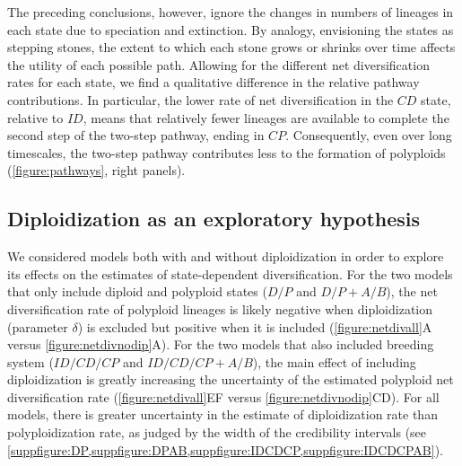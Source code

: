 
The preceding conclusions, however, ignore the changes in numbers of lineages in each state due to speciation and extinction.
By analogy, envisioning the states as stepping stones, the extent to which each stone grows or shrinks over time affects the utility of each possible path.
Allowing for the different net diversification rates for each state, we find a qualitative difference in the relative pathway contributions.
In particular, the lower rate of net diversification in the $CD$ state, relative to $ID$, means that relatively fewer lineages are available to complete the second step of the two-step pathway, ending in $CP$.
Consequently, even over long timescales, the two-step pathway contributes less to the formation of polyploids (\cref{figure:pathways}, right panels).

\subsection{Diploidization as an exploratory hypothesis}

We considered models both with and without diploidization in order to explore its effects on the estimates of state-dependent diversification.
For the two models that only include diploid and polyploid states ($D/P$ and $D/P+A/B$), the net diversification rate of polyploid lineages is likely negative when diploidization (parameter $\delta$) is excluded but positive when it is included (\cref{figure:netdivall}A versus \cref{figure:netdivnodip}A).
For the two models that also included breeding system ($ID/CD/CP$ and $ID/CD/CP+A/B$), the main effect of including diploidization is greatly increasing the uncertainty of the estimated polyploid net diversification rate (\cref{figure:netdivall}EF versus \cref{figure:netdivnodip}CD).
For all models, there is greater uncertainty in the estimate of diploidization rate than polyploidization rate, as judged by the width of the credibility intervals (see \cref{suppfigure:DP,suppfigure:DPAB,suppfigure:IDCDCP,suppfigure:IDCDCPAB}).

